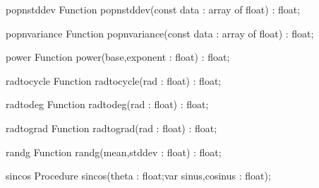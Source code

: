 \FPCexample{}


\begin{function}{popnstddev}
\Declaration
Function popnstddev(const data : array of float) : float;
\Description

\Errors
\SeeAlso
\end{function}

\FPCexample{}


\begin{function}{popnvariance}
\Declaration
Function popnvariance(const data : array of float) : float;
\Description

\Errors
\SeeAlso
\end{function}

\FPCexample{}


\begin{function}{power}
\Declaration
Function power(base,exponent : float) : float;
\Description

\Errors
\SeeAlso
\end{function}

\FPCexample{}


\begin{function}{radtocycle}
\Declaration
Function radtocycle(rad : float) : float;
\Description

\Errors
\SeeAlso
\end{function}

\FPCexample{}


\begin{function}{radtodeg}
\Declaration
Function radtodeg(rad : float) : float;
\Description

\Errors
\SeeAlso
\end{function}

\FPCexample{}


\begin{function}{radtograd}
\Declaration
Function radtograd(rad : float) : float;
\Description

\Errors
\SeeAlso
\end{function}

\FPCexample{}


\begin{function}{randg}
\Declaration
Function randg(mean,stddev : float) : float;
\Description

\Errors
\SeeAlso
\end{function}

\FPCexample{}


\begin{procedure}{sincos}
\Declaration
Procedure sincos(theta : float;var sinus,cosinus : float);
\Description

\Errors
\SeeAlso
\end{procedure}

